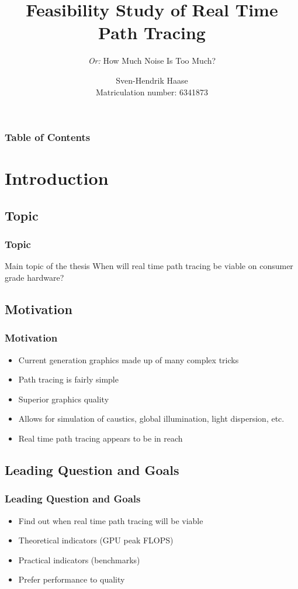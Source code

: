 \documentclass{beamer}
\title[Path Tracing]
{Feasibility Study of Real Time Path Tracing}
\subtitle{\textit{Or:} How Much Noise Is Too Much?}
\author[Haase]{Sven-Hendrik Haase \\ \footnotesize Matriculation number: 6341873}
\institute[University of Hamburg]{
    Department of Computer Science\\
    University of Hamburg
}
\begin{document}
\frame{\titlepage}
\begin{frame}
    \frametitle{Table of Contents}
    \footnotesize
    \tableofcontents
\end{frame}

\section{Introduction}

\subsection{Topic}
\begin{frame}
    \frametitle{Topic}
    \begin{block}{Main topic of the thesis}
        When will real time path tracing be viable on consumer grade hardware?
    \end{block}
\end{frame}

\subsection{Motivation}
\begin{frame}
    \frametitle{Motivation}
    \begin{itemize}
        \item Current generation graphics made up of many complex tricks
        \pause
        \item Path tracing is fairly simple
        \pause
        \item Superior graphics quality
        \pause
        \item Allows for simulation of caustics, global illumination, light dispersion, etc.
        \pause
        \item Real time path tracing appears to be in reach
    \end{itemize}
\end{frame}

\subsection{Leading Question and Goals}
\begin{frame}
    \frametitle{Leading Question and Goals}
    \begin{itemize}
        \item Find out when real time path tracing will be viable
        \item Theoretical indicators (GPU peak FLOPS)
        \item Practical indicators (benchmarks)
        \item Prefer performance to quality
    \end{itemize}
\end{frame}
\end{document}
